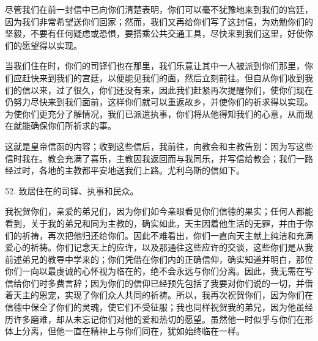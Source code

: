 \par

尽管我们在前一封信中已向你们清楚表明，你们可以毫不犹豫地来到我们的宫廷，因为我们非常希望送你们回家；然而，我们又再给你们写了这封信，为劝勉你们的坚毅，不要有任何疑虑或恐惧，要搭乘公共交通工具，尽快来到我们这里，好使你们的愿望得以实现。\par

\par

当我们住在时，你们的司铎们也在那里，我们乐意让其中一人被派到你们那里，你们应赶快来到我们的宫廷，以便能见我们的面，然后立刻前往。但自从你们收到我们的信以来，过了很久，你们还没有来，因此我们赶紧再次提醒你们，使你们现在仍努力尽快来到我们面前，这样你们就可以重返故乡，并使你们的祈求得以实现。为使你们更充分了解情况，我们已派遣执事，你们将从他得知我们的心意，从而现在就能确保你们所祈求的事。\par

这就是皇帝信函的内容；收到这些信后，我前往，向教会和主教告别：因为写这些信时我在。教会充满了喜乐，主教因我返回而与我同乐，并写信给教会；我们一路经过时，各地的主教都平安地送我们上路。尤利乌斯的信如下。\par

52. 致居住在的司铎、执事和民众。\par

我祝贺你们，亲爱的弟兄们，因为你们如今亲眼看见你们信德的果实；任何人都能看到，关于我的弟兄和同为主教的，确实如此，天主因着他生活的无罪，并由于你们的祈祷，再次把他归还给你们。因此不难看出，你们一直向天主献上纯洁和充满爱心的祈祷。你们记念天上的应许，以及那通往这些应许的交谈，这些你们是从我前述弟兄的教导中学来的；你们凭借在你们内的正确信仰，确实知道并明白，那位你们一向以最虔诚的心怀视为临在的，绝不会永远与你们分离。因此，我无需在写信给你们时多费言辞；因为你们的信仰已经预先包括了我要对你们说的一切，并借着天主的恩宠，实现了你们众人共同的祈祷。所以，我再次祝贺你们，因为你们在信德中保全了你们的灵魂，使它们不受征服；我也同样祝贺我的弟兄，因为他虽经历许多磨难，却从未忘记你们对他的爱和热切的愿望。虽然他一时似乎与你们在形体上分离，但他一直在精神上与你们同在，犹如始终临在一样。\par


